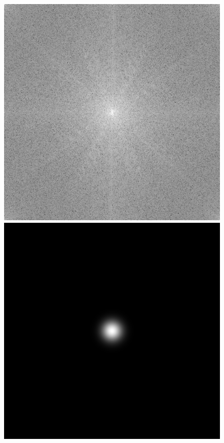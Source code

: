 \documentclass[twoside,twocolumn]{article}
\begin{document}
\begin{figure}[H]
\begin{center}
	\includegraphics[scale=.19]{figures/butterfly_mag_spec_16.png}
	\includegraphics[scale=.19]{figures/butterfly_gau_filter_16.png}

\end{center}
\end{figure}
\end{document}
